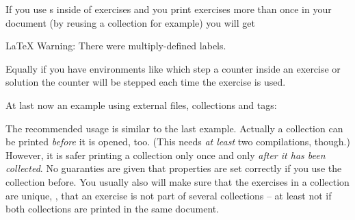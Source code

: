 \documentclass{xsim-manual}
\begin{document}
\begin{bewareofthedog}
  If you use s inside of exercises and you print exercises more
  than once in your document (by reusing a collection for example) you will
  get
\begin{sourcecode}
  LaTeX Warning: There were multiply-defined labels.
\end{sourcecode}
  Equally if you have environments like  which step a
  counter inside an exercise or solution the counter will be stepped each time
  the exercise is used.
\end{bewareofthedog}

At last now an example using external files, collections and tags:
\begin{sourcecode}

  

  
\end{sourcecode}

\begin{bewareofthedog}
  The recommended usage is similar to the last example.  Actually a collection
  can be printed \emph{before} it is opened, too.  (This needs \emph{at least}
  two compilations, though.)  However, it is safer printing a collection only
  once and only \emph{after it has been collected}.  No guaranties are given
  that properties are set correctly if you use the collection before.  You
  usually also will make sure that the exercises in a collection are unique,
  \ie, that an exercise is not part of several collections -- at least not if
  both collections are printed in the same document.
\end{bewareofthedog}
\end{document}
